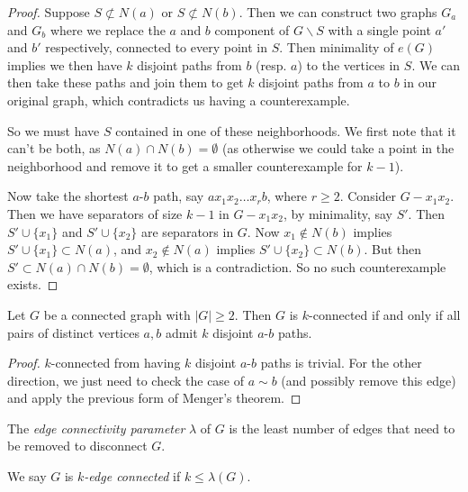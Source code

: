 \documentclass[a3paper, 10pt]{article}
\renewcommand{\vocab}[1]{\emph{#1}}
\begin{document}
\begin{multicols*}{5}
\begin{proof}
    Suppose $S \not \subset N(a)$ or $S \not \subset N(b)$.
    Then we can construct two graphs $G_a$ and $G_b$ where we replace the $a$ and $b$ component of $G \backslash S$ with a single point $a'$ and $b'$ respectively, connected to every point in $S$. Then minimality of $e(G)$ implies we then have $k$ disjoint paths from $b$ (resp. $a$) to the vertices in $S$. We can then take these paths and join them to get $k$ disjoint paths from $a$ to $b$ in our original graph, which contradicts us having a counterexample. 

    So we must have $S$ contained in one of these neighborhoods. We first note that it can't be both, as $N(a) \cap N(b) = \emptyset$ (as otherwise we could take a point in the neighborhood and remove it to get a smaller counterexample for $k - 1$). 

    Now take the shortest $a$-$b$ path, say $a x_1 x_2 \dots x_r b$, where $r \geq 2$. Consider $G - x_1 x_2$. Then we have separators of size $k - 1$ in $G - x_1 x_2$, by minimality, say $S'$. Then $S' \cup \{x_1\}$ and $S' \cup \{x_2\}$ are separators in $G$. Now $x_1 \not \in N(b)$ implies $S' \cup \{x_1\} \subset N(a)$, and $x_2 \not \in N(a)$ implies $S' \cup \{x_2\} \subset N(b)$. But then $S' \subset N(a) \cap N(b) = \emptyset$, which is a contradiction. So no such counterexample exists.
\end{proof}

\begin{corollary}
    Let $G$ be a connected graph with $|G| \geq 2$. Then $G$ is $k$-connected if and only if all pairs of distinct vertices $a, b$ admit $k$ disjoint $a$-$b$ paths.
\end{corollary}
\begin{proof}
    $k$-connected from having $k$ disjoint $a$-$b$ paths is trivial. For the other direction, we just need to check the case of $a \sim b$ (and possibly remove this edge) and apply the previous form of Menger's theorem.
\end{proof}

\begin{definition}
    The \vocab{edge connectivity parameter} $\lambda$ of $G$ is the least number of edges that need to be removed to disconnect $G$.

    We say $G$ is \vocab{$k$-edge connected} if $k \leq \lambda(G)$.
\end{definition}


\end{multicols*}
\end{document}
